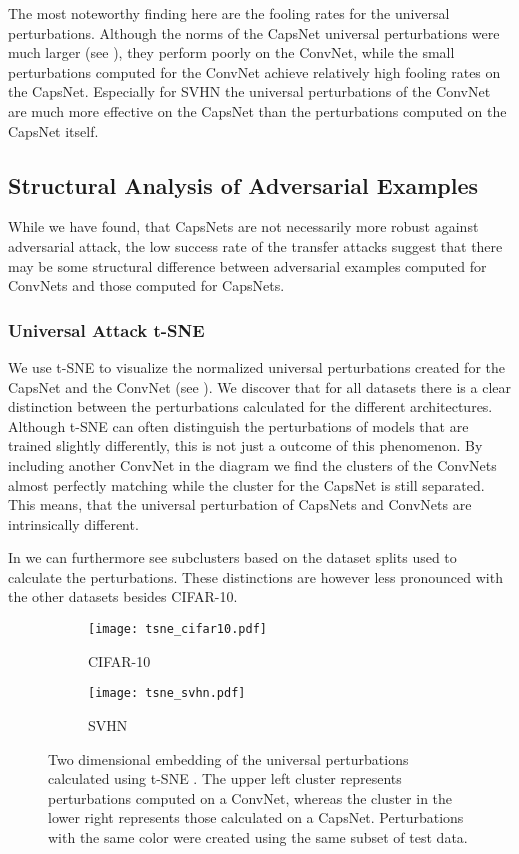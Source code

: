 The most noteworthy finding here are the fooling rates for the universal perturbations.
Although the norms of the CapsNet universal perturbations were much larger (see ), they perform poorly on the ConvNet, while the small perturbations computed for the ConvNet achieve relatively high fooling rates on the CapsNet.
Especially for SVHN the universal perturbations of the ConvNet are much more effective on the CapsNet than the perturbations computed on the CapsNet itself.

\subsection{Structural Analysis of Adversarial Examples}

While we have found, that CapsNets are not necessarily more robust against adversarial attack, the low success rate of the transfer attacks suggest that there may be some structural difference between adversarial examples computed for ConvNets and those computed for CapsNets.

\subsubsection{Universal Attack t-SNE}

We use t-SNE \citep{tsne} to visualize the normalized universal perturbations created for the CapsNet and the ConvNet (see ).
We discover that for all datasets there is a clear distinction between the perturbations calculated for the different architectures.
Although t-SNE can often distinguish the perturbations of models that are trained slightly differently, this is not just a outcome of this phenomenon.
By including another ConvNet in the diagram we find the clusters of the ConvNets almost perfectly matching while the cluster for the CapsNet is still separated.
This means, that the universal perturbation of CapsNets and ConvNets are intrinsically different.

In  we can furthermore see subclusters based on the dataset splits used to calculate the perturbations.
These distinctions are however less pronounced with the other datasets besides CIFAR-10.

\begin{figure}
	\centering
	\begin{subfigure}{.5\textwidth}
	\texttt{[image: tsne\_cifar10.pdf]}
	\caption{CIFAR-10}
	\end{subfigure}%
	\begin{subfigure}{.5\textwidth}
	\texttt{[image: tsne\_svhn.pdf]}
	\caption{SVHN}
	\end{subfigure}
	\caption[t-SNE Plot of Universal Perturbations]{Two dimensional embedding of the universal perturbations calculated using t-SNE \citep{tsne}. The upper left cluster represents perturbations computed on a ConvNet, whereas the cluster in the lower right represents those calculated on a CapsNet. Perturbations with the same color were created using the same subset of test data.}
	\label{fig:tsne}
\end{figure}


